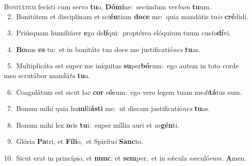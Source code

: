 \lettrine{\initial\textcolor{\initialcolor}{B}}{onitátem} fecísti cum servo \textbf{tu}\-o, \textbf{Dó}\-\textbf{mi}ne:~\star secúndum ver\textit{bum} \textbf{tu}\-um.\\
{\numbfont\textcolor{\numbcolor}{~2.}}~Bonitátem et disciplínam et sci\-\textbf{én}\-tiam \textbf{do}\-\textbf{ce} me:~\star quia mandátis tu\textit{is} \textbf{cré}\-didi.\par
{\numbfont\textcolor{\numbcolor}{~3.}}~Priúsquam humiliárer \textbf{e}\-go de\-\textbf{lí}\-qui:~\star proptérea elóquium tuum cus\-\textit{to}\-\textbf{dí}vi.\par
{\numbfont\textcolor{\numbcolor}{~4.}}~\-\textbf{Bo}\-nus \textbf{es} tu:~\star et in bonitáte tua doce me justificatió\textit{nes} \textbf{tu}\-as.\par
{\numbfont\textcolor{\numbcolor}{~5.}}~Multiplicáta est super me iníquitas \textbf{su}\-per\-\textbf{bó}\-rum:~\star ego autem in toto corde meo scrutábor mandá\textit{ta} \textbf{tu}\-a.\par
{\numbfont\textcolor{\numbcolor}{~6.}}~Coagulátum est sicut lac \textbf{cor} e\-\textbf{ó}\-rum:~\star ego vero legem tuam me\-\textit{di}\-\textbf{tá}tus sum.\par
{\numbfont\textcolor{\numbcolor}{~7.}}~Bonum mihi quia hu\-\textbf{mi}\-li\-\textbf{ás}\-\textbf{ti} me:~\star ut discam justificatió\textit{nes} \textbf{tu}\-as.\par
{\numbfont\textcolor{\numbcolor}{~8.}}~Bonum mihi lex \textbf{o}\-ris \textbf{tu}\-i:~\star super míllia auri et \textit{ar}\-\textbf{gén}ti.\par
{\numbfont\textcolor{\numbcolor}{~9.}}~Glória \textbf{Pa}\-tri, et \textbf{Fí}\-\textbf{li}o,~\star et Spirítu\textit{i} \textbf{Sanc}\-to.\par
{\numbfont\textcolor{\numbcolor}{10.}}~Sicut erat in princípio, et \textbf{nunc}\-, et \textbf{sem}\-per,~\star et in sǽcula sæculó\-\textit{rum}\-. \textbf{A}\-men.\par
